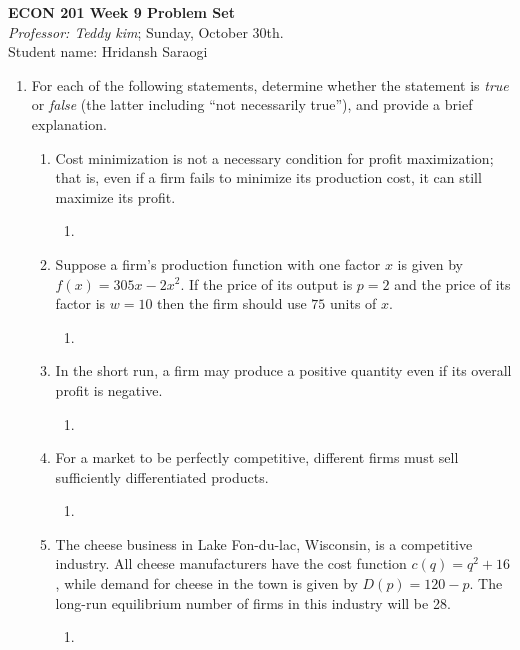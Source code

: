 \documentclass[11pt]{article}
\begin{document}
\begin{center}
\textbf{ECON 201 Week 9 Problem Set}\\
\textit {Professor: Teddy kim};  
Sunday, October 30th.
\\Student name: Hridansh Saraogi
\end{center}


\begin{enumerate}
\item For each of the following statements, determine whether
the statement is \emph{true} or \emph{false} (the latter including ``not necessarily true''), and provide a brief explanation.
    \begin{enumerate}

    \item Cost minimization is not a necessary condition for profit maximization; that is, even if a firm fails to minimize its production cost, it can still maximize its profit.
    \begin{enumerate}
        \item 
    \end{enumerate}

    \item Suppose a firm's production function with one factor $x$ is given by $f(x)=305x-2x^{2}$. If the price of its output is $p=2$ and the price of its factor is $w=10$ then the firm should use $75$ units of $x$.
    \begin{enumerate}
        \item 
    \end{enumerate}

    \item In the short run, a firm may produce a positive quantity even if its overall profit is negative.
    \begin{enumerate}
        \item 
    \end{enumerate}

    \item For a market to be perfectly competitive, different firms must sell sufficiently differentiated products.
    \begin{enumerate}
        \item 
    \end{enumerate}

    \item The cheese business in Lake Fon-du-lac, Wisconsin, is a competitive industry. All cheese manufacturers have the cost function $c(q)=q^{2}+16$, while demand for cheese in the town is given by $D(p)=120-p$. The long-run equilibrium number of firms in this industry will be 28.
    \begin{enumerate}
        \item 
    \end{enumerate}
    \end{enumerate}


\end{enumerate}
\end{document}
